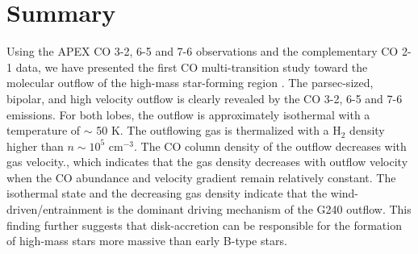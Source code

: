 \section{Summary}\label{summary}

Using the APEX CO 3-2, 6-5 and 7-6 observations and the complementary CO 2-1 data, we have presented the first CO multi-transition study toward the molecular outflow of the high-mass star-forming region . The parsec-sized, bipolar, and high velocity outflow is clearly revealed by the CO 3-2, 6-5 and 7-6 emissions. For both lobes, the outflow is approximately isothermal with a temperature of $\sim$ 50 K. The outflowing gas is thermalized with a H$_2$ density higher than $n \sim 10^5$ cm$^{-3}$. The CO column density of the outflow decreases with gas velocity., which indicates that the gas density decreases with outflow velocity when the CO abundance and velocity gradient remain relatively constant. The isothermal state and the decreasing gas density indicate that the wind-driven/entrainment is the dominant driving mechanism of the G240 outflow. This finding further suggests that disk-accretion can be responsible for the formation of high-mass stars more massive than early B-type stars.

